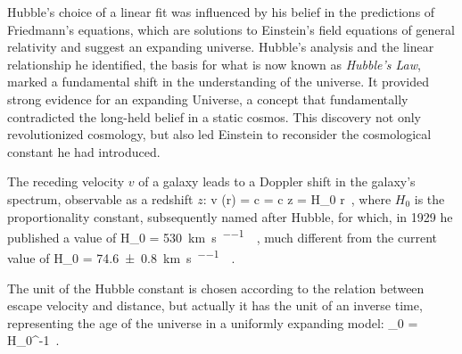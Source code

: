 Hubble's choice of a linear fit was influenced by his belief in the predictions of Friedmann's equations, which are solutions to Einstein's field equations of general relativity and suggest an expanding universe. Hubble's analysis and the linear relationship he identified, the basis for what is now known as \emph{Hubble's Law}, marked a fundamental shift in the understanding of the universe. It provided strong evidence for an expanding Universe, a concept that fundamentally contradicted the long-held belief in a static cosmos. This discovery not only revolutionized cosmology, but also led Einstein to reconsider the cosmological constant he had introduced.

The receding velocity $v$ of a galaxy leads to a Doppler shift in the galaxy's spectrum, observable as a redshift $z$:
\be
\label{eq:1.1}
v (r) = c \frac{\D \l}{\l} = c z = H_0 r \,,
\ee
where $H_0$ is the proportionality constant, subsequently named after Hubble, for which, in 1929 he published \citep{hubble_relation_1929} a value of
\be
\label{eq:1.2}
H_0 = \SI{530}{\kilo\meter\per\second\per\mega\parsec} \,,
\ee
much different from the current value \citep{tully_hubble_2023} of
\be
\label{eq:1.3}
H_0 = \SI[separate-uncertainty=true]{74.6 \pm 0.8}{\kilo\meter\per\second\per\mega\parsec} \,.
\ee

The unit of the Hubble constant is chosen according to the relation between escape velocity and
distance, but actually it has the unit of an inverse time, representing the age of the universe in a uniformly expanding model:
\be
\label{eq:1.4}
\tau_0 = H_0^{-1}  \si{\year} \,.
\ee